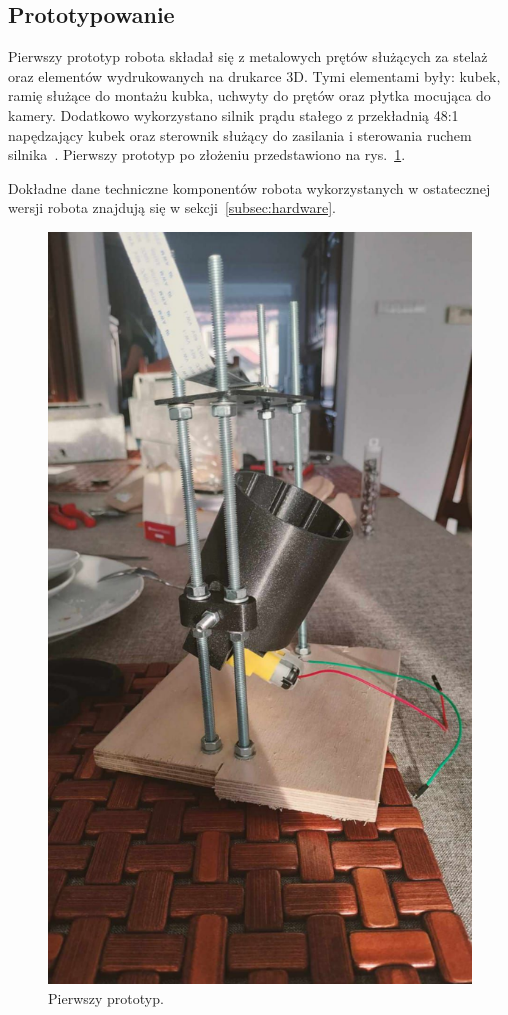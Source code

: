 \subsection{Prototypowanie}\label{subsec:Prototypowanie}

Pierwszy prototyp robota składał się z metalowych prętów służących za stelaż oraz elementów wydrukowanych na drukarce 3D.
Tymi elementami były: kubek, ramię służące do montażu kubka, uchwyty do prętów oraz płytka mocująca do kamery. Dodatkowo
wykorzystano silnik prądu stałego z przekładnią 48:1 napędzający kubek oraz sterownik służący do zasilania i sterowania ruchem silnika~\cite{wheel,L298}.
Pierwszy prototyp po złożeniu przedstawiono na rys.~\ref{fig:pierwszy}.

Dokładne dane techniczne komponentów robota wykorzystanych w ostatecznej wersji robota znajdują się w sekcji~\ref{subsec:hardware}.

\begin{figure}[H]
    \centering
    \includegraphics[width=0.25\linewidth, trim={35mm 75mm 35mm 30mm}, clip]{chapters/03-praca-wlasna/figures/pierwszy}
    \caption{\label{fig:pierwszy}Pierwszy prototyp.}
\end{figure}

